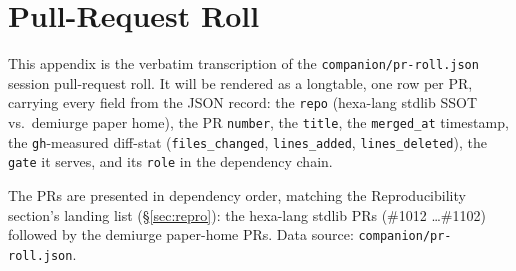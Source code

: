 \section{Pull-Request Roll}
\label{app:pr-roll}

This appendix is the verbatim transcription of the
\texttt{companion/\allowbreak pr-roll.json} session pull-request roll.
It will be rendered as a longtable, one row per PR, carrying every
field from the JSON record:
the \texttt{repo} (hexa-lang stdlib SSOT vs.\ demiurge paper home), the
PR \texttt{number}, the \texttt{title}, the \texttt{merged\_at}
timestamp, the \texttt{gh}-measured diff-stat (\texttt{files\_changed},
\texttt{lines\_added}, \texttt{lines\_deleted}), the \texttt{gate} it
serves, and its \texttt{role} in the dependency chain.

The PRs are presented in dependency order, matching the
Reproducibility section's landing list (\S\ref{sec:repro}): the
hexa-lang stdlib PRs (\#1012 \ldots \#1102) followed by the demiurge
paper-home PRs. Data source: \texttt{companion/pr-roll.json}.
